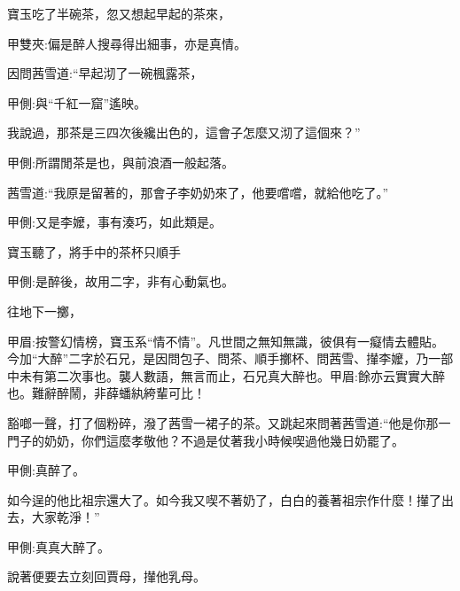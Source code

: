 \begin{parag}
    寶玉吃了半碗茶，忽又想起早起的茶來，\begin{note}甲雙夾:偏是醉人搜尋得出細事，亦是真情。\end{note}因問茜雪道:“早起沏了一碗楓露茶，\begin{note}甲側:與“千紅一窟”遙映。\end{note}我說過，那茶是三四次後纔出色的，這會子怎麼又沏了這個來？”\begin{note}甲側:所謂閒茶是也，與前浪酒一般起落。\end{note}茜雪道:“我原是留著的，那會子李奶奶來了，他要嚐嚐，就給他吃了。”\begin{note}甲側:又是李嬤，事有湊巧，如此類是。\end{note}寶玉聽了，將手中的茶杯只順手\begin{note}甲側:是醉後，故用二字，非有心動氣也。\end{note}往地下一擲，\begin{note}甲眉:按警幻情榜，寶玉系“情不情”。凡世間之無知無識，彼俱有一癡情去體貼。今加“大醉”二字於石兄，是因問包子、問茶、順手擲杯、問茜雪、攆李嬤，乃一部中未有第二次事也。襲人數語，無言而止，石兄真大醉也。甲眉:餘亦云實實大醉也。難辭醉鬧，非薛蟠紈絝輩可比！\end{note}豁啷一聲，打了個粉碎，潑了茜雪一裙子的茶。又跳起來問著茜雪道:“他是你那一門子的奶奶，你們這麼孝敬他？不過是仗著我小時候喫過他幾日奶罷了。\begin{note}甲側:真醉了。\end{note}如今逞的他比祖宗還大了。如今我又喫不著奶了，白白的養著祖宗作什麼！攆了出去，大家乾淨！”\begin{note}甲側:真真大醉了。\end{note}說著便要去立刻回賈母，攆他乳母。
\end{parag}


